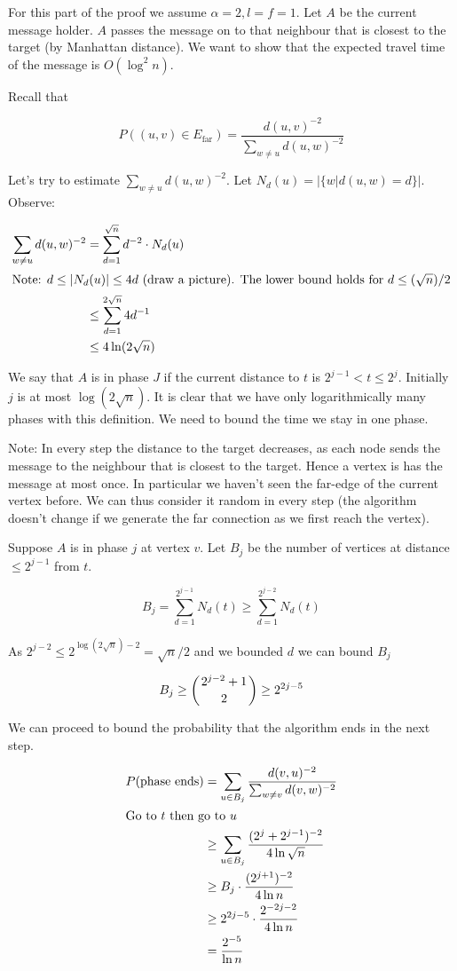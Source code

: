 \begin{pr} For this part of the proof we assume $\alpha=2,l=f=1$. Let $A$ be the current message holder. $A$ passes the message on to that neighbour that is closest to the target (by Manhattan distance). We want to show that the expected travel time of the message is $O(\log^2n)$.

Recall that 

\[P((u,v)\in E_{\text{far}}) = \frac{d(u,v)^{-2}}{\sum_{w\neq u}d(u,w)^{-2}}\]

Let's try to estimate $\sum_{w\neq u}d(u,w)^{-2}$. Let $N_d(u) = |\{w|d(u,w)=d\}|$. Observe:

\begin{align*}
\sum_{w\neq u}d(u,w)^{-2} &= \sum_{d=1}^{\sqrt n} d^{-2}\cdot N_d(u)\\
\intertext{Note: $d\leq |N_d(u)|\leq 4d$ (draw a picture). The lower bound holds for $d\leq (\sqrt n) /2$}
	&\leq \sum_{d=1}^{2\sqrt n} 4 d^{-1}\\
	&\leq 4 \ln(2\sqrt{n})
\end{align*}

We say that $A$ is in phase $J$ if the current distance to $t$ is $2^{j-1} < t \leq 2^j$. Initially $j$ is at most $\log (2\sqrt n)$. It is clear that we have only logarithmically many phases with this definition. We need to bound the time we stay in one phase.

Note: In every step the distance to the target decreases, as each node sends the message to the neighbour that is closest to the target. Hence a vertex is has the message at most once. In particular we haven't seen the far-edge of the current vertex before. We can thus consider it random in every step (the algorithm doesn't change if we generate the far connection as we first reach the vertex).

Suppose $A$ is in phase $j$ at vertex $v$. Let $B_j$ be the number of vertices at distance $\leq 2^{j-1}$ from $t$. 

\[B_j = \sum_{d=1}^{2^{j-1}} N_d(t)\geq \sum_{d=1}^{2^{j-2}} N_d(t)\]

As $2^{j-2} \leq 2^{\log(2\sqrt{n})-2} = \sqrt{n}/2$ and we bounded $d$ we can bound $B_j$

\[B_j \geq \left( {2^{j-2}+1} \atop 2 \right) \geq 2^{2j-5}\]

We can proceed to bound the probability that the algorithm ends in the next step.

\begin{align*}
P(\text{phase ends}) &= \sum_{u\in B_j} \frac{d(v,u)^{-2}}{\sum_{w\neq v} d(v,w)^{-2}}\\
\intertext{Go to $t$ then go to $u$}
&\geq \sum_{u\in B_j} \frac{(2^j+2^{j-1})^{-2}}{4\ln \sqrt{n}}\\
&\geq B_j \cdot \frac{(2^{j+1})^{-2}}{4\ln n}\\
&\geq 2^{2j-5} \cdot \frac{2^{-2j-2}}{4\ln n}\\
&=\frac{2^{-5}}{\ln n}
\end{align*}


\end{pr}
